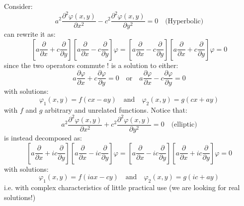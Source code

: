\documentclass{article}
\newcommand{\vp}{\varphi}
\begin{document}
\noindent
Consider:
\begin{equation}
    a^2 \frac{\partial^2 \varphi(x, y)}{\partial x^2}
- c^2 \frac{\partial^2 \varphi(x, y)}{\partial y^2}
= 0 \quad \text{(Hyperbolic)}
\end{equation}
can rewrite it as:
\begin{equation}
    \left[ a \frac{\partial}{\partial x} + c \frac{\partial}{\partial y} \right]
\left[ a \frac{\partial}{\partial x} - c \frac{\partial}{\partial y} \right] \varphi
=
\left[ a \frac{\partial}{\partial x} - c \frac{\partial}{\partial y} \right]
\left[ a \frac{\partial}{\partial x} + c \frac{\partial}{\partial y} \right] \varphi
= 0
\end{equation}
since the two operators commute ! is a solution to either:
\begin{equation}
    a \frac{\partial \vp}{\partial x} + c \frac{\partial \vp}{\partial y} = 0 \quad \text{or} \quad a \frac{\partial \vp}{\partial x} - c \frac{\partial \vp}{\partial y} = 0
\end{equation}
with solutions:
\begin{equation}
    \vp_1 (x,y) = f(cx-ay) \quad \text{and} \quad \vp_2 (x,y) =g(cx+ay)
\end{equation}
with $f$ and $g$ arbitrary and unrelated functions. Notice that:
\begin{equation}
    a^2 \frac{\partial^2 \varphi(x, y)}{\partial x^2}
+ c^2 \frac{\partial^2 \varphi(x, y)}{\partial y^2}
= 0 \quad \text{(elliptic)}
\end{equation}
is instead decomposed as:
\begin{equation}
    \left[ a \frac{\partial}{\partial x} + i c \frac{\partial}{\partial y} \right]
\left[ a \frac{\partial}{\partial x} - i c \frac{\partial}{\partial y} \right] \varphi
=
\left[ a \frac{\partial}{\partial x} - i c \frac{\partial}{\partial y} \right]
\left[ a \frac{\partial}{\partial x} + i c \frac{\partial}{\partial y} \right] \varphi
= 0
\end{equation}
with solutions:
\begin{equation}
    \varphi_1(x, y) = f(i a x - c y)
\quad \text{and} \quad 
\varphi_2(x, y) = g(i c + a y)
\end{equation}
i.e. with complex characteristics of little practical use (we are looking for real solutions!)
\end{document}
